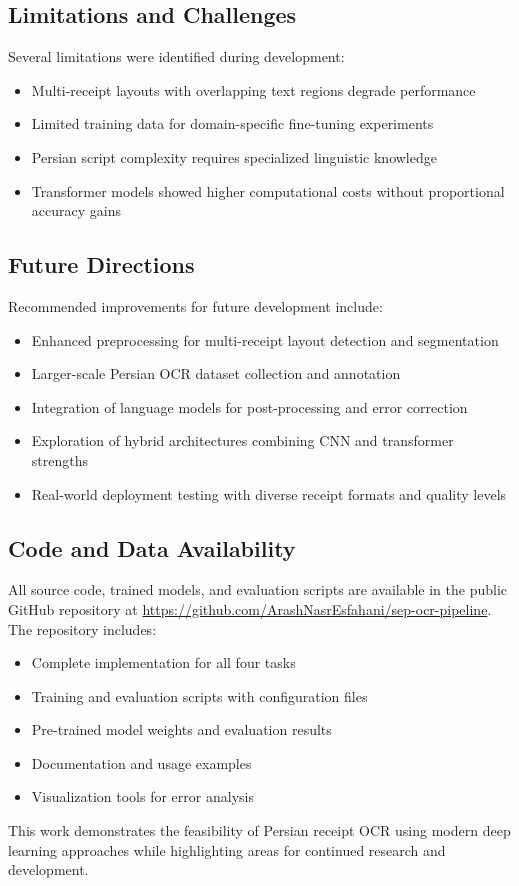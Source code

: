 \documentclass[11pt,a4paper]{article}
\begin{document}
\subsection{Limitations and Challenges}
Several limitations were identified during development:
\begin{itemize}
  \item Multi-receipt layouts with overlapping text regions degrade performance
  \item Limited training data for domain-specific fine-tuning experiments
  \item Persian script complexity requires specialized linguistic knowledge
  \item Transformer models showed higher computational costs without proportional accuracy gains
\end{itemize}

\subsection{Future Directions}
Recommended improvements for future development include:
\begin{itemize}
  \item Enhanced preprocessing for multi-receipt layout detection and segmentation
  \item Larger-scale Persian OCR dataset collection and annotation
  \item Integration of language models for post-processing and error correction
  \item Exploration of hybrid architectures combining CNN and transformer strengths
  \item Real-world deployment testing with diverse receipt formats and quality levels
\end{itemize}

\subsection{Code and Data Availability}
All source code, trained models, and evaluation scripts are available in the public GitHub repository at \url{https://github.com/ArashNasrEsfahani/sep-ocr-pipeline}. The repository includes:
\begin{itemize}
  \item Complete implementation for all four tasks
  \item Training and evaluation scripts with configuration files
  \item Pre-trained model weights and evaluation results
  \item Documentation and usage examples
  \item Visualization tools for error analysis
\end{itemize}

This work demonstrates the feasibility of Persian receipt OCR using modern deep learning approaches while highlighting areas for continued research and development.
\end{document}
